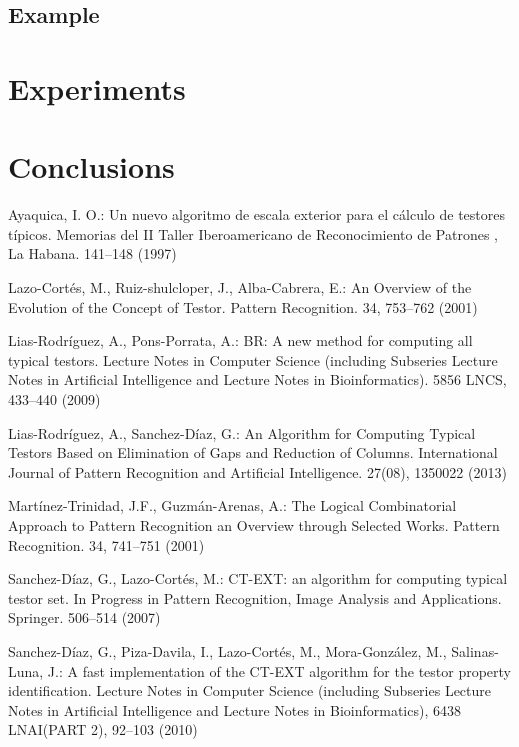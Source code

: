 \documentclass[citeauthoryear]{llncs}
\begin{document}
\subsection{Example}
%
\section{Experiments}
%
%
\section{Conclusions}
%
%
\begin{thebibliography}{}
%


	Ayaquica, I. O.:
	Un nuevo algoritmo de escala exterior para el c\'alculo de testores t\'ipicos.
	Memorias del II Taller Iberoamericano de Reconocimiento de Patrones , La
	Habana. 141--148 (1997)

	Lazo-Cort\'es, M., Ruiz-shulcloper, J., Alba-Cabrera, E.:
	An Overview of the Evolution of the Concept of Testor. 
	Pattern Recognition. 34, 753--762 (2001)

	Lias-Rodr\'iguez, A., Pons-Porrata, A.:
	BR: A new method for computing all typical testors. 
	Lecture Notes in Computer Science (including Subseries Lecture Notes 
	in Artificial Intelligence and Lecture Notes in Bioinformatics).
	5856 LNCS, 433--440 (2009)

	Lias-Rodr\'iguez, A., Sanchez-D\'iaz, G.:
 	An Algorithm for Computing Typical Testors Based on Elimination of Gaps and Reduction of Columns.
 	International Journal of Pattern Recognition and Artificial Intelligence. 27(08), 1350022 (2013)

	Mart\'inez-Trinidad, J.F., Guzm\'an-Arenas, A.: 
	The Logical Combinatorial Approach to Pattern Recognition an Overview through Selected Works. 
	Pattern Recognition. 34, 741--751 (2001)

	Sanchez-D\'iaz, G., Lazo-Cort\'es, M.:
	CT-EXT: an algorithm for computing typical testor set. 
	In Progress in Pattern Recognition, Image Analysis and Applications. Springer. 506--514 (2007)

	Sanchez-D\'iaz, G., Piza-Davila, I., Lazo-Cort\'es, M., Mora-Gonz\'alez, M., Salinas-Luna, J.:
	A fast implementation of the CT-EXT algorithm for the testor property identification. 
	Lecture Notes in Computer Science (including Subseries Lecture Notes in Artificial Intelligence and 
	Lecture	Notes in Bioinformatics), 6438 LNAI(PART 2), 92--103 (2010)


\end{thebibliography}
\end{document}

